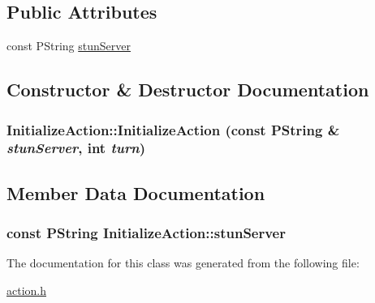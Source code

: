 \subsection*{Public Attributes}
\begin{CompactItemize}
\item 
const PString \hyperlink{classInitializeAction_584d375d97a7b11ef7513dc709d9b8a5}{stunServer}
\end{CompactItemize}


\subsection{Constructor \& Destructor Documentation}
\hypertarget{classInitializeAction_984b7dd9f095a6601f81724bb7186587}{
\subsubsection[{InitializeAction}]{\setlength{\rightskip}{0pt plus 5cm}InitializeAction::InitializeAction (const PString \& {\em stunServer}, \/  int {\em turn})}}
\label{classInitializeAction_984b7dd9f095a6601f81724bb7186587}




\subsection{Member Data Documentation}
\hypertarget{classInitializeAction_584d375d97a7b11ef7513dc709d9b8a5}{
\subsubsection[{stunServer}]{\setlength{\rightskip}{0pt plus 5cm}const PString {\bf InitializeAction::stunServer}}}
\label{classInitializeAction_584d375d97a7b11ef7513dc709d9b8a5}




The documentation for this class was generated from the following file:\begin{CompactItemize}
\item 
\hyperlink{action_8h}{action.h}\end{CompactItemize}
